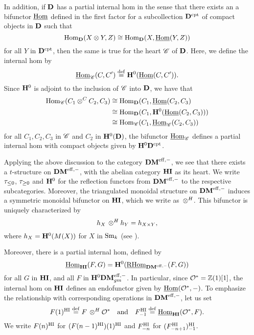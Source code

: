 In addition, if $\DCat$ has a partial internal hom in the sense
that there exists an a bifunctor $\ihom$ defined in the first 
factor for a subcollection $\DCat^{\compact}$ of compact objects 
in $\DCat$ such that
\[
\hom_{\DCat}(X \tensor Y, Z) \cong 
   \hom_{\DCat}(X, \ihom(Y, Z))
\]
for all $Y$ in $\DCat^{\compact}$, then the same is true for the 
heart $\Cat{C}$ of $\DCat$. Here, we define the internal hom by
\[
\ihom_{\Cat{C}}(C, C') \defeq \HH^0(\ihom(C, C')).
\]
Since $\HH^0$ is adjoint to the inclusion of $\Cat{C}$ into
$\DCat$, we have that
\begin{align*}
\hom_{\Cat{C}}(C_1 \tensor^C C_2, C_3) &\cong
\hom_{\DCat}(C_1, \ihom(C_2, C_3) \\
&\cong \hom_{\DCat}(C_1, \HH^0(\ihom(C_2, C_3))) \\
&\cong \hom_{\Cat{C}}(C_1, \ihom_{\Cat{C}}(C_2, C_3))
\end{align*}
for all $C_1, C_2, C_3$ in $\Cat{C}$ and $C_2$ in $\HH^0(\DCat)$,
the bifunctor $\ihom_{\Cat{C}}$ defines a partial internal hom 
with compact objects given by $\HH^0 \DCat^{\compact}$.

Applying the above discussion to the category $\DMeff$, we see 
that there exists a $t$-structure on $\DMeff$, with the abelian 
category $\HI$ as its heart. We write $\gltrunc{0}$, $\ggtrunc{0}$
and $\HH^0$ for the reflection functors from $\DMeff$ to the 
respective subcategories. Moreover, the triangulated monoidal 
structure on $\DMeff$ induces a symmetric monoidal bifunctor on 
$\HI$, which we write as $\tHI$. This bifunctor is uniquely 
characterized by
\[
\hS{X} \tHI \hS{Y} = \hS{X \times Y},
\]
where $\hS{X} = \HH^0(M(X))$ for $X$ in $\Sm$ (see 
\cite[1.8]{DegModHom}).

Moreover, there is a partial internal hom, defined by
\[
\ihomHI(F, G) = \HH^0(\ihomDMf(F, G))
\]
for all $G$ in $\HI$, and all $F$ in $\HH^0\DMeffgm$. In 
particular, since $\Ox = \Z(1)[1]$, the internal hom on $\HI$ 
defines an endofunctor given by $\ihom(\Ox, -)$. To emphasize the
relationship with corresponding operations in $\DMeff$, let us set
\[
\LHIs{F} \defeq F \tHI \Ox \hspace{10pt} \textrm{and}\hspace{10pt} 
   \RHIs{F} \defeq \ihomHI(\Ox, F).
\]
We write $\LHIs[n]{F}$ for $\LHIs{(\LHIs[n - 1]{F})}$ and 
$\RHIs[n]{F}$ for $\RHIs{(\RHIs[n + 1]{F})}$.

